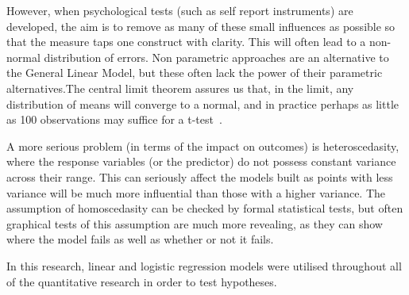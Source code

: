 However, when psychological tests (such as self report instruments) are developed, the aim is to remove as many of these small influences as possible so that the measure taps one construct with clarity. This will often lead to a non-normal distribution of errors. Non parametric approaches are an alternative to the General Linear Model, but these often lack the power of their parametric alternatives.The central limit theorem assures us that, in the limit, any distribution of means will converge to a normal, and in practice perhaps as little as 100 observations may suffice for a t-test~\cite{venables2002modern}. 

A more serious problem (in terms of the impact on outcomes) is heteroscedasity, where the response variables (or the predictor) do not possess constant variance across their range\cite{gelman2007data}. This can seriously affect the models built as points with less variance will be much more influential than those with a higher variance. The assumption of homoscedasity can be checked by formal statistical tests, but often graphical tests of this assumption are much more revealing, as they can show where the model fails as well as whether or not it fails.

In this research, linear and logistic regression models were utilised throughout all of the quantitative research in order to test hypotheses. 





